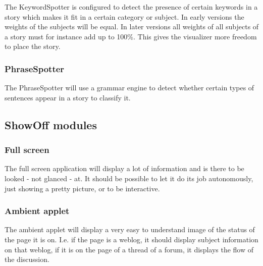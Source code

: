 The KeywordSpotter is configured to detect the presence of certain keywords in
a story which makes it fit in a certain category or subject. In early versions
the weights of the subjects will be equal. In later versions all weights of all
subjects of a story must for instance add up to 100\%. This gives the
visualizer more freedom to place the story.

\subsubsection{PhraseSpotter}

The PhraseSpotter will use a grammar engine to detect whether certain types of
sentences appear in a story to classify it.

\subsection{ShowOff modules}

\subsubsection{Full screen}

The full screen application will display a lot of information and is there to
be looked - not glanced - at. It should be possible to let it do its job
autonomously, just showing a pretty picture, or to be interactive.

\subsubsection{Ambient applet}

The ambient applet will display a very easy to understand image of the status
of the page it is on. I.e. if the page is a weblog, it should display subject
information on that weblog, if it is on the page of a thread of a forum, it
displays the flow of the discussion.

